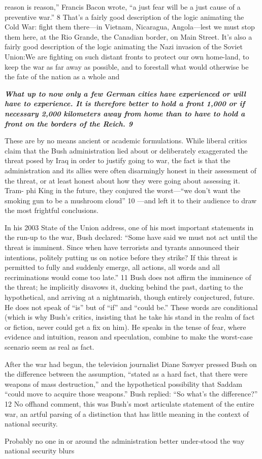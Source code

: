 reason is reason,” Francis Bacon wrote, “a just fear will be a just cause of a preventive war.” {\color{blue} 8 } That’s a fairly good description of the logic animating the Cold War: fight them there—in Vietnam, Nicaragua, Angola—lest we must stop them here, at the Rio Grande, the Canadian border, on Main Street. It’s also a fairly good description of the logic animating the Nazi invasion of the Soviet Union:We are fighting on such distant fronts to protect our own home-land, to keep the war as far away as possible, and to forestall what would otherwise be the fate of the nation as a whole and{\par} {\textbf{\textit{What up to now only a few German cities have experienced or will have to experience. It is therefore better to hold a front 1,000 or if necessary 2,000 kilometers away from home than to have to hold a front on the borders of the Reich. {\color{blue} 9 } } } }{\par} These are by no means ancient or academic formulations. While liberal critics claim that the Bush administration lied about or deliberately exaggerated the threat posed by Iraq in order to justify going to war, the fact is that the administration and its allies were often disarmingly honest in their assessment of the threat, or at least honest about how they were going about assessing it. Tram- phi King in the future, they conjured the worst—“we don’t want the smoking gun to be a mushroom cloud” {\color{blue} 10 } —and left it to their audience to draw the most frightful conclusions.{\par} In his 2003 State of the Union address, one of his most important statements in the run-up to the war, Bush declared: “Some have said we must not act until the threat is imminent. Since when have terrorists and tyrants announced their intentions, politely putting us on notice before they strike? If this threat is permitted to fully and suddenly emerge, all actions, all words and all recriminations would come too late.” {\color{blue} 11 } Bush does not affirm the imminence of the threat; he implicitly disavows it, ducking behind the past, darting to the hypothetical, and arriving at a nightmarish, though entirely conjectured, future. He does not speak of “is” but of “if” and “could be.” These words are conditional (which is why Bush’s critics, insisting that he take his stand in the realm of fact or fiction, never could get a fix on him). He speaks in the tense of fear, where evidence and intuition, reason and speculation, combine to make the worst-case scenario seem as real as fact.{\par} After the war had begun, the television journalist Diane Sawyer pressed Bush on the difference between the assumption, “stated as a hard fact, that there were weapons of mass destruction,” and the hypothetical possibility that Saddam “could move to acquire those weapons.” Bush replied: “So what’s the difference?” {\color{blue} 12 } No offhand comment, this was Bush’s most articulate statement of the entire war, an artful parsing of a distinction that has little meaning in the context of national security.{\par} Probably no one in or around the administration better under-stood the way national security blurs 